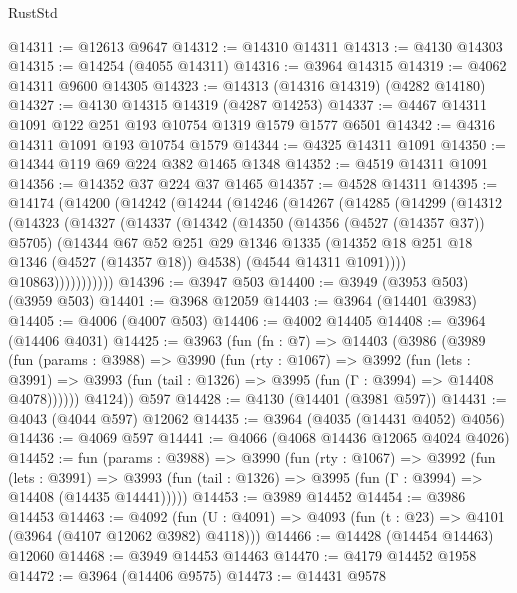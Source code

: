 \begin{lexlean}{RustStd}
\begin{coremodule}
@14311 := @12613 @9647
@14312 := @14310 @14311
@14313 := @4130 @14303
@14315 := @14254 (@4055 @14311)
@14316 := @3964 @14315
@14319 := @4062 @14311 @9600 @14305
@14323 := @14313 (@14316 @14319) (@4282 @14180)
@14327 := @4130 @14315 @14319 (@4287 @14253)
@14337 := @4467 @14311 @1091 @122 @251 @193 @10754 @1319 @1579 @1577 @6501
@14342 := @4316 @14311 @1091 @193 @10754 @1579
@14344 := @4325 @14311 @1091
@14350 := @14344 @119 @69 @224 @382 @1465 @1348
@14352 := @4519 @14311 @1091
@14356 := @14352 @37 @224 @37 @1465
@14357 := @4528 @14311
@14395 := @14174
    (@14200
      (@14242
        (@14244
          (@14246
            (@14267
              (@14285
                (@14299
                  (@14312
                    (@14323
                      (@14327
                        (@14337
                          (@14342
                            (@14350
                              (@14356 (@4527 (@14357 @37)) @5705)
                              (@14344
                                @67
                                @52
                                @251
                                @29
                                @1346
                                @1335
                                (@14352 @18 @251 @18 @1346 (@4527 (@14357 @18)) @4538)
                                (@4544 @14311 @1091))))
                          @10863)))))))))))
@14396 := @3947 @503
@14400 := @3949 (@3953 @503) (@3959 @503)
@14401 := @3968 @12059
@14403 := @3964 (@14401 @3983)
@14405 := @4006 (@4007 @503)
@14406 := @4002 @14405
@14408 := @3964 (@14406 @4031)
@14425 := @3963
    (fun (fn : @7) =>
    @14403
      (@3986
        (@3989
          (fun (params : @3988) =>
          @3990
            (fun (rty : @1067) =>
            @3992
              (fun (lets : @3991) =>
              @3993 (fun (tail : @1326) => @3995 (fun (Γ : @3994) => @14408 @4078))))))
        @4124))
    @597
@14428 := @4130 (@14401 (@3981 @597))
@14431 := @4043 (@4044 @597) @12062
@14435 := @3964 (@4035 (@14431 @4052) @4056)
@14436 := @4069 @597
@14441 := @4066 (@4068 @14436 @12065 @4024 @4026)
@14452 := fun (params : @3988) =>
  @3990
    (fun (rty : @1067) =>
    @3992
      (fun (lets : @3991) =>
      @3993 (fun (tail : @1326) => @3995 (fun (Γ : @3994) => @14408 (@14435 @14441)))))
@14453 := @3989 @14452
@14454 := @3986 @14453
@14463 := @4092
    (fun (U : @4091) => @4093 (fun (t : @23) => @4101 (@3964 (@4107 @12062 @3982) @4118)))
@14466 := @14428 (@14454 @14463) @12060
@14468 := @3949 @14453 @14463
@14470 := @4179 @14452 @1958
@14472 := @3964 (@14406 @9575)
@14473 := @14431 @9578

\end{coremodule}
\end{lexlean}
